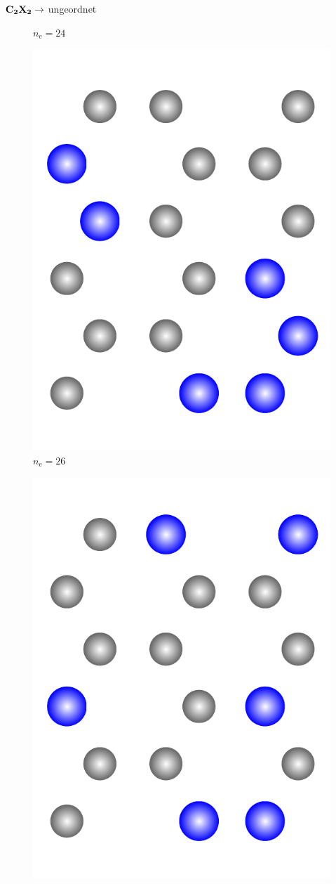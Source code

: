 \documentclass{beamer}
\def \nE {n_\mathrm{e}}
\begin{document}
\begin{frame}{$\bf C_{\boldsymbol 2}X_{\boldsymbol 2} \rightarrow$ ungeordnet}
\begin{figure}
\begin{minipage}[b]{0.19\textwidth}
				$\nE = 24$
			\end{minipage}
			\hfill
			\begin{minipage}[b]{0.19\textwidth}
				\centering
				\includegraphics[height=1.1\textwidth]{Abbildungen/2.pdf} \\
				$\nE = 26$
			\end{minipage}
			\hfill
			\begin{minipage}[b]{0.19\textwidth}
				\centering
				\includegraphics[height=1.1\textwidth]{Abbildungen/3.pdf} \\

\end{minipage}
\end{figure}
\end{frame}
\end{document}
